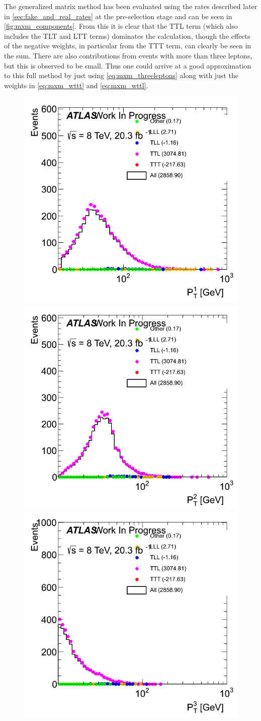 The generalized matrix method has been 
evaluated using the rates described later 
in \sec\ref{sec:fake_and_real_rates}
at the pre-selection stage
and can be seen in \fig\ref{fig:mxm_components}.
From this it is clear that the TTL 
term (which also includes the TLT and LTT terms) 
dominates the calculation,
though the effects of the negative weights, in particular from the TTT
term, can clearly be seen in the sum. There are also contributions
from events with more than three leptons, but this is observed to be small.
Thus one could arrive at a good approximation to this full method
by just using \eqn\eqref{eq:mxm_threeleptons} along with just the
weights in \eqn\eqref{eq:mxm_wttt} and \eqref{eq:mxm_wttl}.
\begin{figure}
\centering
\includegraphics[width=.45\columnwidth]{figures/CompareMxMComponents/ChargeSameSign_PreselCustomRates_Mar19/png/LeadingLeptonPt.png}
\includegraphics[width=.45\columnwidth]{figures/CompareMxMComponents/ChargeSameSign_PreselCustomRates_Mar19/png/SubleadingLeptonPt.png}
\includegraphics[width=.45\columnwidth]{figures/CompareMxMComponents/ChargeSameSign_PreselCustomRates_Mar19/png/MinimumLeptonPt.png}

\end{figure}
